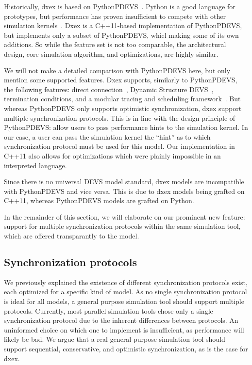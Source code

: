 Historically, dxex is based on PythonPDEVS~\cite{PythonPDEVS}.
Python is a good language for prototypes, but performance has proven insufficient to compete with other simulation kernels~\cite{MasterThesis}.
Dxex is a C++11-based implementation of PythonPDEVS, but implements only a subset of PythonPDEVS, whiel making some of its own additions.
So while the feature set is not too comparable, the architectural design, core simulation algorithm, and optimizations, are highly similar.

We will not make a detailed comparison with PythonPDEVS here, but only mention some supported features.
Dxex supports, similarly to PythonPDEVS, the following features: direct connection~\cite{SymbolicFlattening}, \textsf{Dynamic Structure DEVS}~\cite{DSDEVS}, termination conditions, and a modular tracing and scheduling framework~\cite{PythonPDEVS}.
But whereas PythonPDEVS only supports optimistic synchronization, dxex support multiple synchronization protocols.
This is in line with the design principle of PythonPDEVS: allow users to pass performance hints to the simulation kernel.
In our case, a user can pass the simulation kernel the ``hint'' as to which synchronization protocol must be used for this model.
Our implementation in C++11 also allows for optimizations which were plainly impossible in an interpreted language.

Since there is no universal \textsf{DEVS} model standard, dxex models are incompatible with PythonPDEVS and vice versa.
This is due to dxex models being grafted on C++11, whereas PythonPDEVS models are grafted on Python.

In the remainder of this section, we will elaborate on our prominent new feature: support for multiple synchronization protocols within the same simulation tool, which are offered transparantly to the model.

\subsection{Synchronization protocols}
We previously explained the existence of different synchronization protocols exist, each optimized for a specific kind of model.
As no single synchronization protocol is ideal for all models, a general purpose simulation tool should support multiple protocols.
Currently, most parallel simulation tools chose only a single synchronization protocol due to the inherent differences between protocols.
An uninformed choice on which one to implement is insufficient, as performance will likely be bad.
We argue that a real general purpose simulation tool should support sequential, conservative, and optimistic synchronization, as is the case for dxex.

